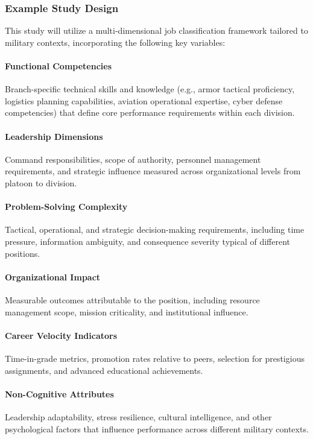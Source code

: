 \documentclass[../main.tex]{subfiles}
\begin{document}
\subsubsection{Example Study Design}

This study will utilize a multi-dimensional job classification framework tailored to military contexts, incorporating the following key variables:

\paragraph{Functional Competencies} Branch-specific technical skills and knowledge (e.g., armor tactical proficiency, logistics planning capabilities, aviation operational expertise, cyber defense competencies) that define core performance requirements within each division.

\paragraph{Leadership Dimensions} Command responsibilities, scope of authority, personnel management requirements, and strategic influence measured across organizational levels from platoon to division.

\paragraph{Problem-Solving Complexity} Tactical, operational, and strategic decision-making requirements, including time pressure, information ambiguity, and consequence severity typical of different positions.

\paragraph{Organizational Impact} Measurable outcomes attributable to the position, including resource management scope, mission criticality, and institutional influence.

\paragraph{Career Velocity Indicators} Time-in-grade metrics, promotion rates relative to peers, selection for prestigious assignments, and advanced educational achievements.

\paragraph{Non-Cognitive Attributes} Leadership adaptability, stress resilience, cultural intelligence, and other psychological factors that influence performance across different military contexts.
\end{document}
